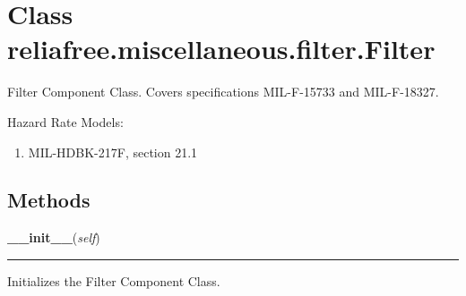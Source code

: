 %
%
%


\section{Class reliafree.miscellaneous.filter.Filter}

    \label{reliafree:miscellaneous:filter:Filter}
Filter Component Class. Covers specifications MIL-F-15733 and MIL-F-18327.

Hazard Rate Models:

\begin{enumerate}

\setlength{\parskip}{0.5ex}
  \item MIL-HDBK-217F, section 21.1

\end{enumerate}



  \subsection{Methods}

    \label{reliafree:miscellaneous:filter:Filter:__init__}

    \vspace{0.5ex}

\hspace{.8\funcindent}\begin{boxedminipage}{\funcwidth}

    \raggedright \textbf{\_\_init\_\_}(\textit{self})

    \vspace{-1.5ex}

    \rule{\textwidth}{0.5\fboxrule}
\setlength{\parskip}{2ex}
    Initializes the Filter Component Class.

\setlength{\parskip}{1ex}
    \end{boxedminipage}

